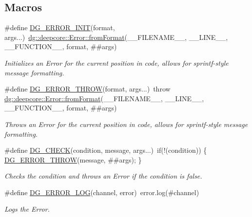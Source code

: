 \subsection*{Macros}
\begin{DoxyCompactItemize}
\item 
\#define \hyperlink{group___utility_module_gaf6227f9c970f2c98edd3520ed616f6ec}{D\+G\+\_\+\+E\+R\+R\+O\+R\+\_\+\+I\+N\+IT}(format,  args...)~\hyperlink{group___utility_module_ga00500e337578c7170d2608cb93af4f51}{dg\+::deepcore\+::\+Error\+::from\+Format}(\+\_\+\+\_\+\+F\+I\+L\+E\+N\+A\+M\+E\+\_\+\+\_\+, \+\_\+\+\_\+\+L\+I\+N\+E\+\_\+\+\_\+, \+\_\+\+\_\+\+F\+U\+N\+C\+T\+I\+O\+N\+\_\+\+\_\+, format, \#\#args)
\begin{DoxyCompactList}\small\item\em Initializes an Error for the current position in code, allows for sprintf-\/style message formatting. \end{DoxyCompactList}\item 
\#define \hyperlink{group___utility_module_ga0460fddf1407217eacdeff8e007cbdbf}{D\+G\+\_\+\+E\+R\+R\+O\+R\+\_\+\+T\+H\+R\+OW}(format,  args...)~throw \hyperlink{group___utility_module_ga00500e337578c7170d2608cb93af4f51}{dg\+::deepcore\+::\+Error\+::from\+Format}(\+\_\+\+\_\+\+F\+I\+L\+E\+N\+A\+M\+E\+\_\+\+\_\+, \+\_\+\+\_\+\+L\+I\+N\+E\+\_\+\+\_\+, \+\_\+\+\_\+\+F\+U\+N\+C\+T\+I\+O\+N\+\_\+\+\_\+, format, \#\#args)
\begin{DoxyCompactList}\small\item\em Throws an Error for the current position in code, allows for sprintf-\/style message formatting. \end{DoxyCompactList}\item 
\#define \hyperlink{group___utility_module_gaa226e9947e37cd076e8adf02ab473910}{D\+G\+\_\+\+C\+H\+E\+CK}(condition,  message,  args...)~if(!(condition)) \{ \hyperlink{group___utility_module_ga0460fddf1407217eacdeff8e007cbdbf}{D\+G\+\_\+\+E\+R\+R\+O\+R\+\_\+\+T\+H\+R\+OW}(message, \#\#args); \}
\begin{DoxyCompactList}\small\item\em Checks the condition and throws an Error if the condition is false. \end{DoxyCompactList}\item 
\#define \hyperlink{group___utility_module_ga43295d768f6d9ee49180610e3d1a99ee}{D\+G\+\_\+\+E\+R\+R\+O\+R\+\_\+\+L\+OG}(channel,  error)~error.\+log(\#channel)
\begin{DoxyCompactList}\small\item\em Logs the Error. \end{DoxyCompactList}\item 

\end{DoxyCompactItemize}
